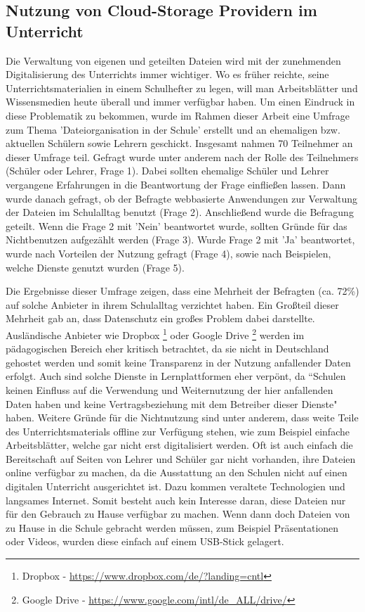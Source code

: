 \subsection{Nutzung von Cloud-Storage Providern im Unterricht}
\label{sec:survey}

Die Verwaltung von eigenen und geteilten Dateien wird mit der zunehmenden Digitalisierung des Unterrichts immer wichtiger. Wo es früher reichte, seine Unterrichtsmaterialien in einem Schulhefter zu legen, will man Arbeitsblätter und Wissensmedien heute überall und immer verfügbar haben. Um einen Eindruck in diese Problematik zu bekommen, wurde im Rahmen dieser Arbeit eine Umfrage zum Thema 'Dateiorganisation in der Schule' \cite{survey:umfragedateiorganisation} erstellt und an ehemaligen bzw. aktuellen Schülern sowie Lehrern geschickt. Insgesamt nahmen 70 Teilnehmer  an dieser Umfrage teil. Gefragt wurde unter anderem nach der Rolle des Teilnehmers (Schüler oder Lehrer, Frage 1). Dabei sollten ehemalige Schüler und Lehrer vergangene Erfahrungen in die Beantwortung der Frage einfließen lassen. Dann wurde danach gefragt, ob der Befragte webbasierte Anwendungen zur Verwaltung der Dateien im Schulalltag benutzt (Frage 2). Anschließend wurde die Befragung geteilt. Wenn die Frage 2 mit 'Nein' beantwortet wurde, sollten Gründe für das Nichtbenutzen aufgezählt werden (Frage 3). Wurde Frage 2 mit 'Ja' beantwortet, wurde nach Vorteilen der Nutzung gefragt (Frage 4), sowie nach Beispielen, welche Dienste genutzt wurden (Frage 5). 

Die Ergebnisse \cite{survey:umfragedateiorganisationergebnisse} dieser Umfrage zeigen, dass eine Mehrheit der Befragten (ca. 72\%) auf solche Anbieter in ihrem Schulalltag verzichtet haben. Ein Großteil dieser Mehrheit gab an, dass Datenschutz ein großes Problem dabei darstellte. Ausländische Anbieter wie Dropbox \footnote{Dropbox - \url{https://www.dropbox.com/de/?landing=cntl}} oder Google Drive \footnote{Google Drive - \url{https://www.google.com/intl/de_ALL/drive/}} werden im pädagogischen Bereich eher kritisch betrachtet, da sie nicht in Deutschland gehostet werden und somit keine Transparenz in der Nutzung anfallender Daten erfolgt. Auch sind solche Dienste in Lernplattformen eher verpönt, da ``Schulen keinen Einfluss auf die Verwendung und Weiternutzung der hier anfallenden Daten haben und keine Vertragsbeziehung mit dem Betreiber dieser Dienste" \cite{online:itslearningmythenundfakten} haben. Weitere Gründe für die Nichtnutzung sind unter anderem, dass weite Teile des Unterrichtsmaterials offline zur Verfügung stehen, wie zum Beispiel einfache Arbeitsblätter, welche gar nicht erst digitalisiert werden. Oft ist auch einfach die Bereitschaft auf Seiten von Lehrer und Schüler gar nicht vorhanden, ihre Dateien online verfügbar zu machen, da die Ausstattung an den Schulen nicht auf einen digitalen Unterricht ausgerichtet ist. Dazu kommen veraltete Technologien und langsames Internet. Somit besteht auch kein Interesse daran, diese Dateien nur für den Gebrauch zu Hause verfügbar zu machen. Wenn dann doch Dateien von zu Hause in die Schule gebracht werden müssen, zum Beispiel Präsentationen oder Videos, wurden diese einfach auf einem USB-Stick gelagert.

